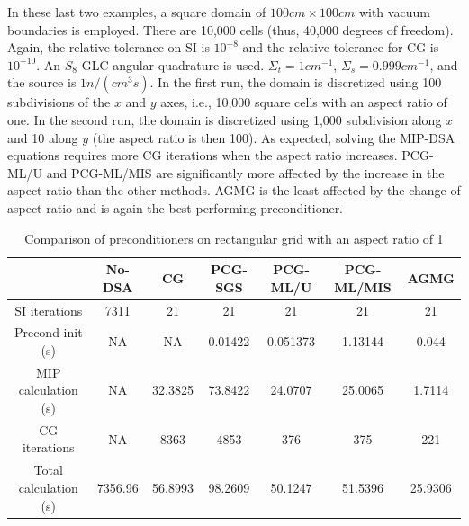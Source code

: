 In these last two examples, a square domain  of $100cm \times 100cm$ with vacuum boundaries
is employed. There are 10,000 cells (thus, 40,000 degrees of freedom). Again, the relative 
tolerance on SI is $10^{-8}$ and the relative tolerance for CG is $10^{-10}$. 
An $S_8$ GLC angular quadrature is used. $\Sigma_t = 1cm^{-1}$, $\Sigma_s = 0.999cm^{-1}$,
and the source is $1n/(cm^3s)$. 
In the first run, the domain is discretized using 100 subdivisions of the $x$ and $y$
axes, i.e., 10,000 square cells with an aspect ratio of one. In the second run, 
the domain is discretized using 1,000 subdivision along $x$ and 10 along $y$ 
(the aspect ratio is then 100).
%
As expected, solving the MIP-DSA equations requires more CG iterations when the aspect
ratio increases. PCG-ML/U and PCG-ML/MIS are significantly more affected by the
increase in the aspect ratio than the other methods. AGMG is the least
affected by the change of aspect ratio and is again the best performing
preconditioner.
%
\begin{table}[!htbp]
  \caption{Comparison of preconditioners on rectangular grid with an aspect
  ratio of 1}
  \begin{center}
    \begin{tabular}{|c|c|c|c|c|c|c|}
      \hline
       & No-DSA & CG & PCG-SGS & PCG-ML/U & PCG-ML/MIS & AGMG \\
      \hline
      SI iterations & 7311      & 21      & 21      & 21       & 21      & 21 \\
   Precond init (s) & NA        & NA      & 0.01422 & 0.051373 & 1.13144 &
      0.044 \\
MIP calculation (s) & NA        & 32.3825 & 73.8422 & 24.0707  & 25.0065 &
      1.7114 \\
      CG iterations & NA        & 8363    & 4853    & 376      & 375     &
      221\\
Total calculation (s) & 7356.96 & 56.8993 & 98.2609 & 50.1247  & 51.5396 &
      25.9306 \\
      \hline
    \end{tabular}
    \label{table_ar_1}
  \end{center}
\end{table}
%
